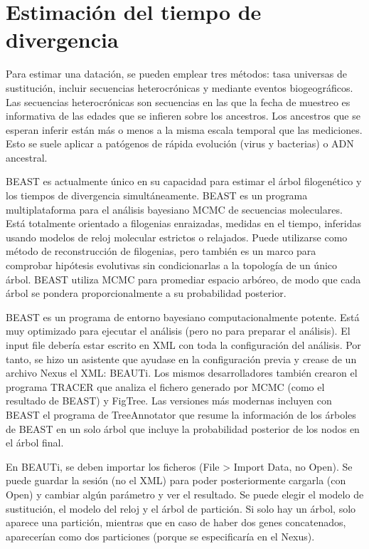 \section{Estimación del tiempo de divergencia}
Para estimar una datación, se pueden emplear tres métodos: tasa universas de sustitución, incluir secuencias heterocrónicas y mediante eventos biogeográficos. Las secuencias heterocrónicas son secuencias en las que la fecha de muestreo es informativa de las edades que se infieren sobre los ancestros. Los ancestros que se esperan inferir están más o menos a la misma escala temporal que las mediciones. Esto se suele aplicar a patógenos de rápida evolución (virus y bacterias) o ADN ancestral.

BEAST es actualmente único en su capacidad para estimar el árbol filogenético y los tiempos de divergencia simultáneamente. BEAST es un programa multiplataforma para el análisis bayesiano MCMC de secuencias moleculares. Está totalmente orientado a filogenias enraizadas, medidas en el tiempo, inferidas usando modelos de reloj molecular estrictos o relajados. Puede utilizarse como método de reconstrucción de filogenias, pero también es un marco para comprobar hipótesis evolutivas sin condicionarlas a la topología de un único árbol. BEAST utiliza MCMC para promediar espacio arbóreo, de modo que cada árbol se pondera proporcionalmente a su probabilidad posterior.

BEAST es un programa de entorno bayesiano computacionalmente potente. Está muy optimizado para ejecutar el análisis (pero no para preparar el análisis). El input file debería estar escrito en XML con toda la configuración del análisis. Por tanto, se hizo un asistente que ayudase en la configuración previa y crease de un archivo Nexus el XML: BEAUTi. Los mismos desarrolladores también crearon el programa TRACER que analiza el fichero generado por MCMC (como el resultado de BEAST) y FigTree. Las versiones más modernas incluyen con BEAST el programa de TreeAnnotator que resume la información de los árboles de BEAST en un solo árbol que incluye la probabilidad posterior de los nodos en el árbol final. 

En BEAUTi, se deben importar los ficheros (File > Import Data, no Open). Se puede guardar la sesión (no el XML) para poder posteriormente cargarla (con Open) y cambiar algún parámetro y ver el resultado. Se puede elegir el modelo de sustitución, el modelo del reloj y el árbol de partición. Si solo hay un árbol, solo aparece una partición, mientras que en caso de haber dos genes concatenados, aparecerían como dos particiones (porque se especificaría en el Nexus). 

